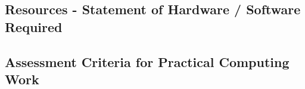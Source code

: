 \documentclass[../CHEFCookingHelperForEveryonesFridge.tex]{subfiles}
\begin{document}
\subsection{Resources - Statement of Hardware / Software Required}

\subsection{Assessment Criteria for Practical Computing Work}

\end{document}
